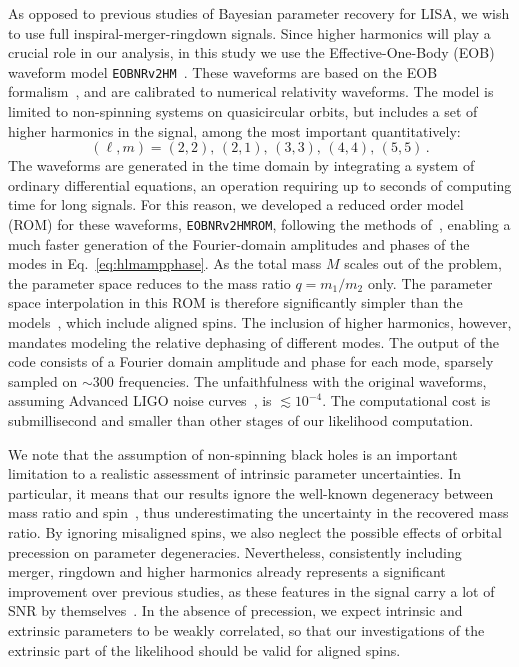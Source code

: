 \documentclass[aps,showpacs,twocolumn,prd,superscriptaddress,nofootinbib]{revtex4-1}
\newcommand{\be}{\begin{equation}}
\newcommand{\ee}{\end{equation}}
\begin{document}
As opposed to previous studies of Bayesian parameter recovery for LISA, we wish to use full inspiral-merger-ringdown signals. Since higher harmonics will play a crucial role in our analysis, in this study we use the Effective-One-Body (EOB) waveform model \texttt{EOBNRv2HM}~\cite{Pan+11}. These waveforms are based on the EOB formalism~\cite{BD99, BD00}, and are calibrated to numerical relativity waveforms. The model is limited to non-spinning systems on quasicircular orbits, but includes a set of higher harmonics in the signal, among the most important quantitatively:
\be\label{eq:listmodes}
	(\ell, m) = (2,2) ,\, (2,1) ,\, (3,3) ,\, (4,4) ,\, (5,5) \,.
\ee
The waveforms are generated in the time domain by integrating a system of ordinary differential equations, an operation requiring up to seconds of computing time for long signals. For this reason, we developed a reduced order model (ROM) for these waveforms, \texttt{EOBNRv2HMROM}, following the methods of~\cite{Puerrer14}, enabling a much faster generation of the Fourier-domain amplitudes and phases of the modes in Eq.~\eqref{eq:hlmampphase}. As the total mass $M$ scales out of the problem, the parameter space reduces to the mass ratio $q=m_{1}/m_{2}$ only. The parameter space interpolation in this ROM is therefore significantly simpler than the models~\cite{Puerrer14, Puerrer15, Bohe+16}, which include aligned spins. The inclusion of higher harmonics, however, mandates modeling the relative dephasing of different modes. The output of the code consists of a Fourier domain amplitude and phase for each mode, sparsely sampled on $\sim 300$ frequencies. The unfaithfulness with the original waveforms, assuming Advanced LIGO noise curves~\cite{UnofficialNoiseCurves18}, is $\lesssim 10^{-4}$. The computational cost is submillisecond and smaller than other stages of our likelihood computation.

We note that the assumption of non-spinning black holes is an important limitation to a realistic assessment of intrinsic parameter uncertainties. In particular, it means that our results ignore the well-known degeneracy between mass ratio and spin~\cite{CF94, PW95, Baird+2013}, thus underestimating the uncertainty in the recovered mass ratio. By ignoring misaligned spins, we also neglect the possible effects of orbital precession on parameter degeneracies. Nevertheless, consistently including merger, ringdown and higher harmonics already represents a significant improvement over previous studies, as these features in the signal carry a lot of SNR by themselves~\cite{Babak+08, Thorpe+08, McWilliams+09, McWilliams+10, McWilliams+11, Klein+15}.
In the absence of precession, we expect intrinsic and extrinsic parameters to be weakly correlated, so that  our investigations of the extrinsic part of the likelihood should be valid for aligned spins.
\end{document}
